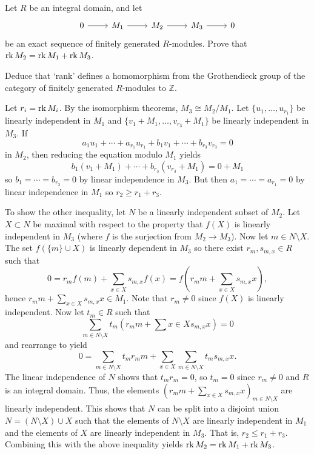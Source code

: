 \documentclass[../../master.tex]{subfiles}
\begin{document}
\begin{problem}
    Let $R$ be an integral domain, and let
    \[
    \begin{tikzcd}
        0 & M_1 & M_2 & M_3 & 0
        \arrow[from=1-1, to=1-2] 
        \arrow[from=1-2, to=1-3] 
        \arrow[from=1-3, to=1-4] 
        \arrow[from=1-4, to=1-5] 
    \end{tikzcd}
    \]
    be an exact sequence of finitely generated $R$-modules.
    Prove that $\operatorname{rk} M_2 = \operatorname{rk} M_1 + \operatorname{rk} M_3$.

    Deduce that `rank' defines a homomorphism from the Grothendieck group of the category of finitely generated $R$-modules to $\mathbb{Z}$.
\end{problem}

\begin{solution}
    Let $r_i = \operatorname{rk} M_i$.
    By the isomorphism theorems, $M_3 \cong M_2 / M_1$.
    Let $\{u_1, \ldots, u_{r_1}\}$ be linearly independent in $M_1$ and $\{v_1 + M_1, \ldots, v_{r_3} + M_1\}$ be linearly independent in $M_3$.
    If
    \[
        a_1 u_1 + \cdots + a_{r_1} u_{r_1} + b_1 v_1 + \cdots + b_{r_3} v_{r_3} = 0
    \]
    in $M_2$, then reducing the equation modulo $M_1$ yields
    \[
        b_1 (v_1 + M_1) + \cdots + b_{r_3} (v_{r_3} + M_1) = 0 + M_1
    \]
    so $b_1 = \cdots = b_{r_3} = 0$ by linear independence in $M_3$.
    But then $a_1 = \cdots = a_{r_1} = 0$ by linear independence in $M_1$ so $r_2 \geq r_1 + r_3$.
    
    To show the other inequality, let $N$ be a linearly independent subset of $M_2$.
    Let $X \subset N$ be maximal with respect to the property that $f(X)$ is linearly independent in $M_3$ (where $f$ is the surjection from $M_2 \to M_3$).
    Now let $m \in N \setminus X$.
    The set $f(\{m\} \cup X)$ is linearly dependent in $M_3$ so there exist $r_m, s_{m,x} \in R$ such that
    \[
        0 = r_m f(m) + \sum_{x \in X} s_{m,x} f(x) = f\left( r_m m + \sum_{x \in X} s_{m,x} x\right),
    \]
    hence $r_m m + \sum_{x \in X} s_{m,x} x \in M_1$.
    Note that $r_m \neq 0$ since $f(X)$ is linearly independent.
    Now let $t_m \in R$ such that
    \[
        \sum_{m \in N \setminus X} t_m (r_m m + \sum{x \in X} s_{m,x} x) = 0
    \]
    and rearrange to yield
    \[
        0 = \sum_{m \in N \setminus X} t_m r_m m + \sum_{x \in X} \sum_{m \in N \setminus X} t_m s_{m,x} x.
    \]
    The linear independence of $N$ shows that $t_m r_m = 0$, so $t_m = 0$ since $r_m \neq 0$ and $R$ is an integral domain.
    Thus, the elements $(r_m m + \sum_{x \in X} s_{m,x} x)_{m \in N \setminus X}$ are linearly independent.
    This shows that $N$ can be split into a disjoint union $N = (N \setminus X) \cup X$ such that the elements of $N \setminus X$ are linearly independent in $M_1$ and the elements of $X$ are linearly independent in $M_3$.
    That is, $r_2 \leq r_1 + r_3$.
    Combining this with the above inequality yields $\operatorname{rk} M_2 = \operatorname{rk} M_1 + \operatorname{rk} M_3$.
\end{solution}
\end{document}
